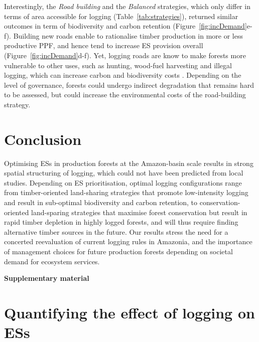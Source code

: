 \documentclass{article}
\newcommand{\beginsupplement}{%
        \setcounter{table}{0}
        \renewcommand{\thetable}{S\arabic{table}}%
        \setcounter{figure}{0}
        \renewcommand{\thefigure}{S\arabic{figure}}%
     }
\begin{document}
Interestingly, the \textit{Road building} and the \textit{Balanced} strategies, which only differ in terms of area accessible for logging (Table~\ref{tab:strategies}), returned similar outcomes in term of biodiversity and carbon retention (Figure~\ref{fig:incDemand}e-f).
Building new roads enable to rationalise timber production in more or less productive PPF, and hence tend to increase ES provision overall (Figure~\ref{fig:incDemand}d-f). 
Yet, logging roads are know to make forests more vulnerable to other uses, such as hunting, wood-fuel harvesting and illegal logging, which can increase carbon and biodiversity costs \cite{Laurance2009a}. Depending on the level of governance, forests could undergo indirect degradation that remains hard to be assessed, but could increase the environmental costs of the road-building strategy. 

\section{Conclusion}

Optimising ESs in production forests at the Amazon-basin scale results in strong spatial structuring of logging, which could not have been predicted from local studies. Depending on ES prioritisation, optimal logging configurations range from timber-oriented land-sharing strategies that promote low-intensity logging and result in sub-optimal biodiversity and carbon retention, to conservation-oriented land-sparing strategies that maximise forest conservation but result in rapid timber depletion in highly logged forests, and will thus require finding alternative timber sources in the future. Our results stress the need for a concerted reevaluation of current logging rules in Amazonia, and the importance of management choices for future production forests depending on societal demand for ecosystem services. 

\clearpage





\onecolumn
\beginsupplement
\appendix
\begin{center}
    { \huge \textbf{Supplementary material}}
\end{center} 

\section{Quantifying the effect of logging on ESs}
\label{sec:ESestimation}
\end{document}
